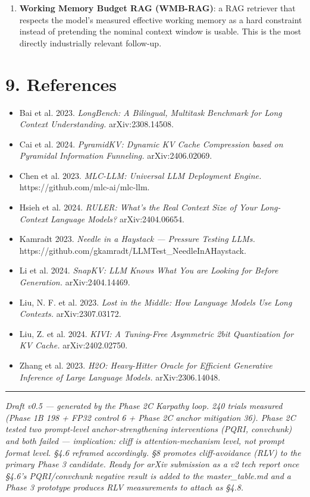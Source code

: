 \documentclass[11pt]{article}
\begin{document}
\begin{enumerate}
\item \textbf{Working Memory Budget RAG (WMB-RAG)}: a RAG retriever that respects the model's measured effective working memory as a hard constraint instead of pretending the nominal context window is usable. This is the most directly industrially relevant follow-up.
\end{enumerate}


\section*{9. References}


\begin{itemize}
\item Bai et al. 2023. \textit{LongBench: A Bilingual, Multitask Benchmark for Long Context Understanding.} arXiv:2308.14508.
\item Cai et al. 2024. \textit{PyramidKV: Dynamic KV Cache Compression based on Pyramidal Information Funneling.} arXiv:2406.02069.
\item Chen et al. 2023. \textit{MLC-LLM: Universal LLM Deployment Engine.} https://github.com/mlc-ai/mlc-llm.
\item Hsieh et al. 2024. \textit{RULER: What's the Real Context Size of Your Long-Context Language Models?} arXiv:2404.06654.
\item Kamradt 2023. \textit{Needle in a Haystack — Pressure Testing LLMs.} https://github.com/gkamradt/LLMTest\_NeedleInAHaystack.
\item Li et al. 2024. \textit{SnapKV: LLM Knows What You are Looking for Before Generation.} arXiv:2404.14469.
\item Liu, N. F. et al. 2023. \textit{Lost in the Middle: How Language Models Use Long Contexts.} arXiv:2307.03172.
\item Liu, Z. et al. 2024. \textit{KIVI: A Tuning-Free Asymmetric 2bit Quantization for KV Cache.} arXiv:2402.02750.
\item Zhang et al. 2023. \textit{H2O: Heavy-Hitter Oracle for Efficient Generative Inference of Large Language Models.} arXiv:2306.14048.
\end{itemize}


\medskip\hrule\medskip


\textit{Draft v0.5 — generated by the Phase 2C Karpathy loop. 240 trials measured (Phase 1B 198 + FP32 control 6 + Phase 2C anchor mitigation 36). Phase 2C tested two prompt-level anchor-strengthening interventions (PQRI, convchunk) and both failed — implication: cliff is attention-mechanism level, not prompt format level. §4.6 reframed accordingly. §8 promotes cliff-avoidance (RLV) to the primary Phase 3 candidate. Ready for arXiv submission as a v2 tech report once §4.6's PQRI/convchunk negative result is added to the master\_table.md and a Phase 3 prototype produces RLV measurements to attach as §4.8.}
\end{document}
